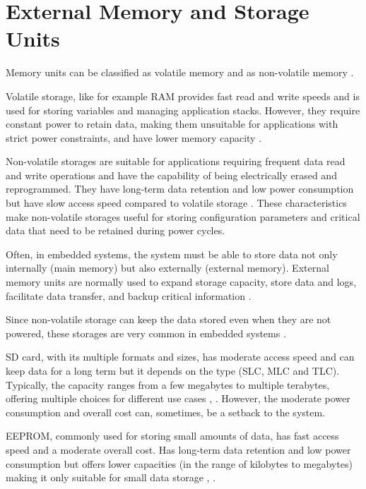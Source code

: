 
\section{External Memory and Storage Units}

Memory units can be classified as volatile memory and as non-volatile memory \cite{mem3}.

Volatile storage, like for example \gls{RAM} provides fast read and write speeds and is used for storing variables and managing application stacks.
However, they require constant power to retain data, making them unsuitable for applications with strict power constraints, and have lower memory capacity \cite{mem8}.

Non-volatile storages are suitable for applications requiring frequent data read and write operations and have the capability of being electrically erased and reprogrammed.
They have long-term data retention and low power consumption but have slow access speed compared to volatile storage \cite{mem8}.
These characteristics make non-volatile storages useful for storing configuration parameters and critical data that need to be retained during power cycles.

Often, in embedded systems, the system must be able to store data not only internally (main memory) but also externally (external memory).
External memory units are normally used to expand storage capacity, store data and logs, facilitate data transfer, and backup critical information \cite{mem3}.

Since non-volatile storage can keep the data stored even when they are not powered, these storages are very common in embedded systems \cite{mem1}.

\gls{SD} card, with its multiple formats and sizes, has moderate access speed and can keep data for a long term but it depends on the type (\gls{SLC}, \gls{MLC} and \gls{TLC}).
Typically, the capacity ranges from a few megabytes to multiple terabytes, offering multiple choices for different use cases \cite{mem11}, \cite{mem9}.
However, the moderate power consumption and overall cost can, sometimes, be a setback to the system.

\gls{EEPROM}, commonly used for storing small amounts of data, has fast access speed and a moderate overall cost.
Has long-term data retention and low power consumption but offers lower capacities (in the range of kilobytes to megabytes) making it only suitable for small data storage \cite{mem8}, \cite{mem11}.

